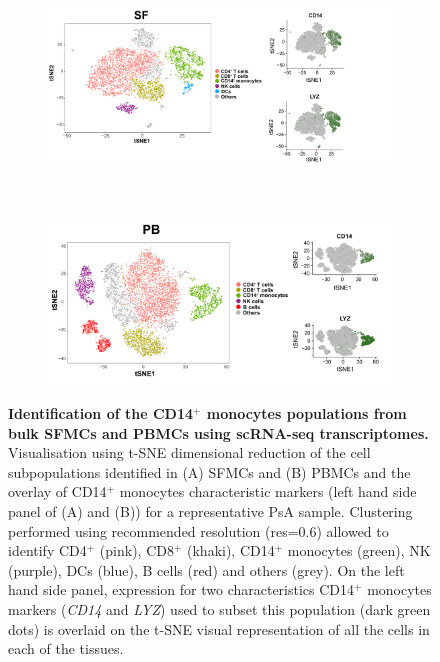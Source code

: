\bigskip
\begin{figure}[htbp]
\centering
\begin{subfigure}[b]{0.70\textwidth}
\centering 
\includegraphics[width=\textwidth]{./Appendix/pdfs/Chapter5/PSA_SF_clusters_and_monocytes_markers}
\caption{}
\end{subfigure}
~
\begin{subfigure}[b]{0.70\textwidth} 
\centering
\includegraphics[width=\textwidth]{./Appendix/pdfs/Chapter5/PSA_PB_clusters_and_monocytes_markers}
\caption{}
\end{subfigure}
\caption[Identification of the CD14$^+$ monocytes populations from bulk SFMCs and PBMCs using scRNA-seq transcriptomes.]{\textbf{Identification of the CD14$^+$ monocytes populations from bulk SFMCs and PBMCs using scRNA-seq transcriptomes.} Visualisation using t-SNE dimensional reduction of the cell subpopulations identified in (A) SFMCs and (B) PBMCs and the overlay of CD14$^+$ monocytes characteristic markers (left hand side panel of (A) and (B))  for a representative PsA sample. Clustering performed using recommended resolution (res=0.6) allowed to identify CD4$^+$ (pink), CD8$^+$ (khaki), CD14$^+$ monocytes (green), NK (purple), DCs (blue), B cells (red) and others (grey). On the left hand side panel, expression for two characteristics CD14$^+$ monocytes markers (\textit{CD14} and \textit{LYZ}) used to subset this population (dark green dots) is overlaid on the t-SNE visual representation of all the cells in each of the tissues.}
\label{figure:PsA_scRNAseq_SF_an_PB_monocytes_identification_from_bulk}
\end{figure}




